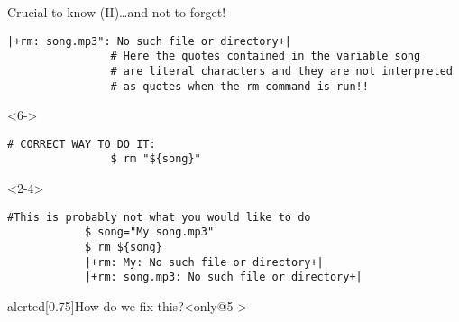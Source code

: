 \begin{frame}[fragile]{Crucial to know (II)}{\ldots{}and not to forget!}
\begin{overlayarea}{\textwidth}{0.5\textheight}
\begin{onlyenv}
\begin{lstlisting}[style=MyBash]
                |+rm: song.mp3": No such file or directory+|
                # Here the quotes contained in the variable song
                # are literal characters and they are not interpreted
                # as quotes when the rm command is run!!
            \end{lstlisting}
        \end{onlyenv}
        \begin{onlyenv}<6->
            \begin{lstlisting}[style=MyBash, firstnumber=9]
                # CORRECT WAY TO DO IT:
                $ rm "${song}"
            \end{lstlisting}
        \end{onlyenv}
    \end{overlayarea}
    \begin{onlyenv}<2-4>
        \begin{lstlisting}[style=MyBash]
            #This is probably not what you would like to do
            $ song="My song.mp3"
            $ rm ${song}
            |+rm: My: No such file or directory+|
            |+rm: song.mp3: No such file or directory+|
        \end{lstlisting}
    \end{onlyenv}
    \medskip
    \begin{varblock}{alerted}[0.75\textwidth]{How do we fix this?}<only@5->
    \end{varblock}
\end{frame}
